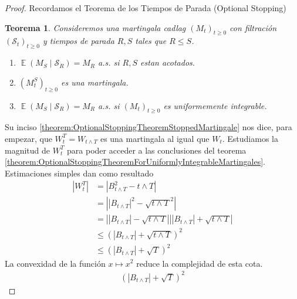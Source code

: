\documentclass{article}
\DeclareMathOperator{\Expectation}{\mathbb{E}}
\newcommand{\brownian}{B}
\newcommand{\wiener}{W}
\newcommand{\sEvents}{\mathscr{S}}
\newtheorem{theorem}{Teorema}
\theoremstyle{definition}
\begin{document}
\begin{proof}
Recordamos el Teorema de los Tiempos de Parada (Optional Stopping)
\begin{theorem}
\newcommand{\martingale}{M}
Consideremos una martingala cadlag \((\martingale_t)_{t \geq 0}\) con filtración \((\sEvents_t)_{t \geq 0}\) y tiempos de parada \(R, S\) tales que \(R \leq S\).
\begin{enumerate}[ref=\theexercise.\labelenumi]
	\item \(\Expectation(\martingale_S \mid \sEvents_R) = \martingale_R\) a.s. si \(R, S\) estan acotados. 
	\item 
	\label{theorem:OptionalStoppingTheoremStoppedMartingale}
	\(\left( \martingale^S_t \right)_{t \geq 0}\) es una martingala.
	\item 
	\label{theorem:OptionalStoppingTheoremForUniformlyIntegrableMartingales}
	\(\Expectation(\martingale_S \mid \sEvents_R) = \martingale_R\) a.s. si \((\martingale_t)_{t \geq 0}\) es uniformemente integrable.
\end{enumerate}
\end{theorem}
Su inciso \ref{theorem:OptionalStoppingTheoremStoppedMartingale} nos dice, para empezar, que \(\wiener^T_t = \wiener_{t \wedge T}\) es una martingala al igual que \(\wiener_t\).
Estudiamos la magnitud de \(\wiener^T_t\) para poder acceder a las conclusiones del teorema \ref{theorem:OptionalStoppingTheoremForUniformlyIntegrableMartingales}.
Estimaciones simples dan como resultado
\begin{align}
	\left| \wiener^T_t \right|
	&=
	\left| \brownian_{t \wedge T}^2 - t \wedge T \right|
	\\
	&=
	\left| \left| \brownian_{t \wedge T} \right|^2 - \sqrt{t \wedge T}^2 \right|
	\\
	&=
	\left| \left| \brownian_{t \wedge T} \right| - \sqrt{t \wedge T} \right| \left| \left| \brownian_{t \wedge T} \right| + \sqrt{t \wedge T} \right|
	\\
	&\leq
	\left( \left| \brownian_{t \wedge T} \right| + \sqrt{t \wedge T} \right)^2
	\\
	&\leq
	\left( \left| \brownian_{t \wedge T} \right| + \sqrt{T} \right)^2
\end{align}
La convexidad de la función \(x \mapsto x^2\) reduce la complejidad de esta cota.
\begin{align}
	\left( \left| \brownian_{t \wedge T} \right| + \sqrt{T} \right)^2 

\end{align}
\end{proof}
\end{document}
